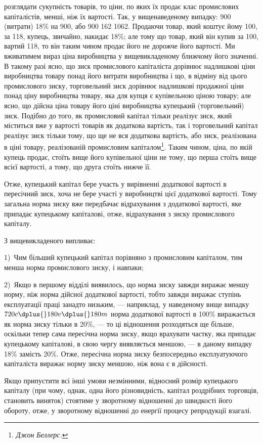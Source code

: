 \parcont{}  %
розглядати сукупність товарів, то ціни, по яких їх продає клас
промислових капіталістів, менші, ніж їх вартості. Так, у вищенаведеному випадку: 900 (витрати) \dplus{} 18\%
на 900, або 900 \dplus{} 162 \deq{}
1062. Продаючи товар, який коштує йому 100, за 118, купець, звичайно,
накидає 18\%; але тому що товар, який він купив за 100,
вартий 118, то він таким чином продає його не дорожче його
вартості. Ми вживатимем вираз ціна виробництва у вищевикладеному
ближчому його значенні. В такому разі ясно, що зиск
промислового капіталіста дорівнює надлишкові ціни виробництва
товару понад його витрати виробництва і що, в відміну від цього
промислового зиску, торговельний зиск дорівнює надлишкові
продажної ціни понад ціну виробництва товару, яка для купця
є купівельною ціною товару; але ясно, що дійсна ціна товару \deq{}
його ціні виробництва \dplus{} купецький (торговельний) зиск. Подібно
до того, як промисловий капітал тільки реалізує зиск, який міститься
вже у вартості товарів як додаткова вартість, так і торговельний
капітал реалізує зиск тільки тому, що ще не вся
додаткова вартість, або зиск, реалізована в ціні товару, реалізованій
промисловим капіталом\footnote{
\emph{Джон Беллерс.}
}. Таким чином, ціна, по якій купець
продає, стоїть вище його купівельної ціни не тому, що
перша стоїть вище всієї вартості, а тому, що друга стоїть нижче її.

Отже, купецький капітал бере участь у вирівненні додаткової
вартості в пересічний зиск, хоча не бере участі у виробництві
цієї додаткової вартості. Тому загальна норма зиску вже
передбачає відрахування з додаткової вартості, яке припадає купецькому
капіталові, отже, відрахування з зиску промислового
капіталу.

З вищевикладеного випливає:

1)~Чим більший купецький капітал порівняно з промисловим
капіталом, тим менша норма промислового зиску, і навпаки;

2)~Якщо в першому відділі виявилось, що норма зиску завжди
виражає меншу норму, ніж норма дійсної додаткової вартості,
тобто завжди виражає ступінь експлуатації праці занадто низьким,
— наприклад, у наведеному вище випадку $720 c \dplus{} 180 v \dplus{} 180 m$
норма додаткової вартості в 100\% виражається як норма зиску
тільки в 20\%, — то ці відношення розходяться ще більше,
оскільки тепер сама пересічна норма зиску, якщо врахувати
частку, яка припадає купецькому капіталові, в свою чергу виявляється
меншою, — в даному випадку 18\% замість 20\%. Отже,
пересічна норма зиску безпосередньо експлуатуючого капіталіста
виражає норму зиску меншою, ніж вона є в дійсності.

Якщо припустити всі інші умови незмінними, відносний розмір
купецького капіталу (при чому, однак, одна його різновидність,
капітал роздрібних торговців, становить виняток) стоятиме
у зворотному відношенні до швидкості його обороту, отже,
у зворотному відношенні до енергії процесу репродукції взагалі.
\parbreak{}  %
